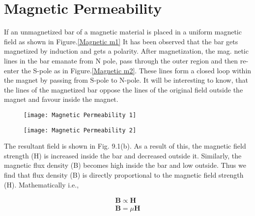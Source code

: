 \section{Magnetic Permeability}
If an unmagnetized bar of a magnetic material is placed in a uniform magnetic field as shown in Figure.\ref{Magnetic m1}  It has been observed that the bar gets magnetized by induction and gets a polarity. After magnetization, the mag. netic lines in the bar emanate from $\mathrm{N}$ pole, pass through the outer region and then re-enter the S-pole as in Figure.\ref{Magnetic m2}. These lines form a closed loop within the magnet by passing from $\mathrm{S}$-pole to $\mathrm{N}$-pole. It will be interesting to know, that the lines of the magnetized bar oppose the lines of the original field outside the magnet and favour inside the magnet.\\
\begin{center}

	\begin{figure}[H]
	\begin{minipage}{0.45\textwidth}
		\texttt{[image: Magnetic Permeability 1]}
\end{minipage}\hfill
\begin{minipage}{0.45\textwidth}
		\texttt{[image: Magnetic Permeability 2]}
\end{minipage}
\caption{}
\label{}
\end{figure}
\end{center}
The resultant field is shown in Fig. 9.1(b). As a result of this, the magnetic field strength (H) is increased inside the bar and decreased outside it. Similarly, the magnetic flux density (B) becomes high inside the bar and low outside. Thus we find that flux density (B) is directly proportional to the magnetic field strength (H). Mathematically
i.e.,

\begin{align*}
\mathbf{B} \propto \mathbf{H} \\
\mathbf{B}=\mu \mathbf{H}
\end{align*}

